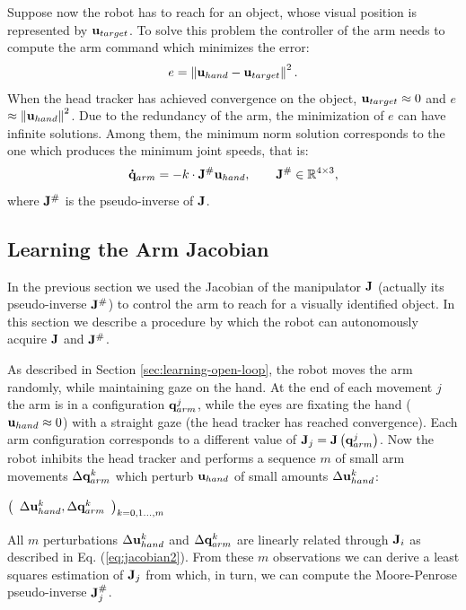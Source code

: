 Suppose now the robot has to reach for an object, whose visual position is 
represented by $\mathbf{u}_{target}$. To solve this problem 
the controller of the arm needs to compute the arm command which minimizes 
the error:
%
\begin{equation}
  e=\left\|\mathbf{u}_{hand}-\mathbf{u}_{target}\right\|^2.
\end{equation}
%
When the head tracker has achieved convergence on the object, 
$\mathbf{u}_{target} \approx 0 $ and $e$ $\approx \left\|\mathbf{u}_{hand}\right\|^2$.
Due to the redundancy of the arm, the minimization of $e$ can have
infinite solutions. Among them, the minimum norm solution corresponds
to the one which produces the minimum joint speeds, that is:
%
\begin{equation}
\mathbf{\dot q}_{arm}=-k \cdot \mathbf J^\# \mathbf{u}_{hand}, 
\qquad \mathbf J^\# \in \mathbb R^{4 \times 3},
\end{equation}
%
where $\mathbf J^\#$ is the pseudo-inverse of $\mathbf J$.

\subsection{Learning the Arm Jacobian}
%
In the previous section we used the Jacobian of the manipulator
$\mathbf J$ (actually its pseudo-inverse $\mathbf J^\#$) to 
control the arm to reach for a visually identified object. In 
this section we describe a procedure by which the robot can 
autonomously acquire $\mathbf J$ and $\mathbf J^\#$.

As described in Section \ref{sec:learning-open-loop}, the robot 
moves the arm randomly, while maintaining gaze on the hand. At 
the end of each movement $j$ the arm is in a configuration 
$\mathbf q_{arm}^j$,  while the eyes are fixating the hand 
($\mathbf{u}_{hand} \approx 0$) with a straight gaze
(the head tracker has reached convergence). Each 
arm configuration corresponds to a different value of 
$\mathbf J_j=\mathbf J\left(\mathbf q_{arm}^j\right)$. 
Now the robot inhibits the head tracker and performs a sequence $m$
of small arm movements $\Delta \mathbf {q}_{arm}^k$ which perturb 
$\mathbf{u}_{hand}$ of small amounts $\Delta \mathbf {u}_{hand}^k$:
%
\begin{center}
\begin{math}
  \left(\begin{array}{cc}
    \Delta \mathbf {u}_{hand}^k , 
	\Delta \mathbf {q}_{arm}^k \end{array}
  \right)_{k = 0,1\dots,m}
\end{math}
\end{center}
%
All $m$ perturbations $\Delta \mathbf {u}_{hand}^k$ and 
$\Delta \mathbf {q}_{arm}^k$ are linearly related through $\mathbf J_i$ 
as described in Eq. (\ref{eq:jacobian2}). From these $m$ 
observations we can derive a least squares estimation of $\mathbf J_j$ from 
which, in turn, we can compute the Moore-Penrose pseudo-inverse $\mathbf J_j^\#$. 


